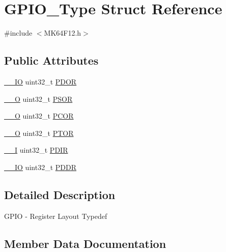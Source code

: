 \hypertarget{structGPIO__Type}{}\section{G\+P\+I\+O\+\_\+\+Type Struct Reference}
\label{structGPIO__Type}


{\ttfamily \#include $<$M\+K64\+F12.\+h$>$}

\subsection*{Public Attributes}
\begin{DoxyCompactItemize}
\item 
\hyperlink{core__sc300_8h_aec43007d9998a0a0e01faede4133d6be}{\+\_\+\+\_\+\+IO} uint32\+\_\+t \hyperlink{structGPIO__Type_a361aec1ddf4e89774ea1d4a0fddd6ef4}{P\+D\+OR}
\item 
\hyperlink{core__sc300_8h_a7e25d9380f9ef903923964322e71f2f6}{\+\_\+\+\_\+O} uint32\+\_\+t \hyperlink{structGPIO__Type_a669ea2d1371abbcd552de208ea9230bc}{P\+S\+OR}
\item 
\hyperlink{core__sc300_8h_a7e25d9380f9ef903923964322e71f2f6}{\+\_\+\+\_\+O} uint32\+\_\+t \hyperlink{structGPIO__Type_a6c70e08238cd1fda316a11095b493719}{P\+C\+OR}
\item 
\hyperlink{core__sc300_8h_a7e25d9380f9ef903923964322e71f2f6}{\+\_\+\+\_\+O} uint32\+\_\+t \hyperlink{structGPIO__Type_aec9404442ba35916e2a747d2d0bf73de}{P\+T\+OR}
\item 
\hyperlink{core__sc300_8h_af63697ed9952cc71e1225efe205f6cd3}{\+\_\+\+\_\+I} uint32\+\_\+t \hyperlink{structGPIO__Type_a269fc0ec9450f3e86b2acddef2db7999}{P\+D\+IR}
\item 
\hyperlink{core__sc300_8h_aec43007d9998a0a0e01faede4133d6be}{\+\_\+\+\_\+\+IO} uint32\+\_\+t \hyperlink{structGPIO__Type_a45c27e8ed0373953904b073c03bd1de5}{P\+D\+DR}
\end{DoxyCompactItemize}


\subsection{Detailed Description}
G\+P\+IO -\/ Register Layout Typedef 

\subsection{Member Data Documentation}
